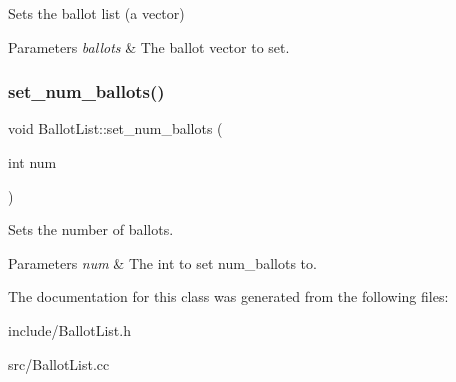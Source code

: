 Sets the ballot list (a vector) 


\begin{DoxyParams}{Parameters}
{\em ballots} & The ballot vector to set. \\
\hline
\end{DoxyParams}
\mbox{\label{class_ballot_list_abc969edf27fe35f064322fb02e1180a9}} 
\subsubsection{\texorpdfstring{set\+\_\+num\+\_\+ballots()}{set\_num\_ballots()}}
{\footnotesize\ttfamily void Ballot\+List\+::set\+\_\+num\+\_\+ballots (\begin{DoxyParamCaption}\item[{int}]{num }\end{DoxyParamCaption})\hspace{0.3cm}{\ttfamily [inline]}}



Sets the number of ballots. 


\begin{DoxyParams}{Parameters}
{\em num} & The int to set num\+\_\+ballots to. \\
\hline
\end{DoxyParams}


The documentation for this class was generated from the following files\+:\begin{DoxyCompactItemize}
\item 
include/Ballot\+List.\+h\item 
src/Ballot\+List.\+cc\end{DoxyCompactItemize}
